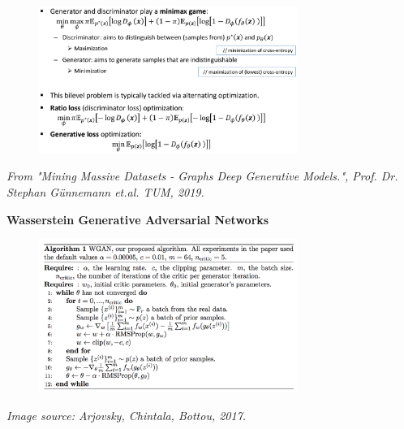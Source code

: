 \documentclass{tum-presentation}
\begin{document}
\begin{frame}
	\begin{figure}
		\centering
		\includegraphics[width=0.75\textwidth,keepaspectratio=true]{tum-resources/images/gan_8.png}
		\label{fig:gan_8}
	\end{figure}
\begin{flushright}
	\textit{	From "Mining Massive Datasets - Graphs Deep Generative Models.", Prof. Dr. Stephan Günnemann et.al. TUM, 2019. }
\end{flushright}
\end{frame}

\begin{frame}[c]
	\centering
	\begin{center}
		\Huge\textbf{Wasserstein Generative Adversarial Networks}
	\end{center}
\end{frame}

\begin{frame}
	\begin{figure}
		\centering
		\includegraphics[width=0.75\textwidth,keepaspectratio=true]{tum-resources/images/wgan_1.png}
		\label{fig:wgan_1}
	\end{figure}
	\begin{flushright}
		\textit{Image source: Arjovsky, Chintala,  Bottou, 2017.}
	\end{flushright}
\end{frame}
\end{document}
